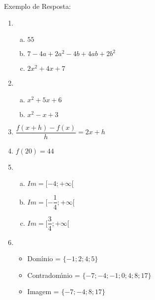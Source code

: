 \documentclass[12pt]{article}
\begin{document}

Exemplo de Resposta:
\begin{res}
    \begin{multicols}{2}

        \begin{enumerate}[(1)]

            \item
                \begin{enumerate}[(a)]
                    \item $55$
                    \item $7 - 4 a + 2 a^{2} - 4 b + 4 a b + 2 b^{2}$
                    \item $2x^{2}+4x+7$
                \end{enumerate}

            \item
                \begin{enumerate}[(a)]
                    \item $x^{2}+5x+6$
                    \item $x^{2}-x+3$
                \end{enumerate}

            \item $\dfrac{f\left( x+h\right) -f\left( x\right) }{h}=2x+h$

            \item $f\left( 20\right)=44$

            \item
                \begin{enumerate}[(a)]
                    \item $Im=[-4;+\infty[$
                    \item $Im=[-\dfrac{1}{4};+\infty[$
                    \item $Im=[\dfrac{3}{4};+\infty[$
                \end{enumerate}
            \columnbreak
            \item
                \begin{itemize}
                    \item Dom\'{\i}nio = $\{ -1;2;4;5\}$
                    \item Contradom\'{\i}nio = $\{-7;-4;-1;0;4;8;17\}$
                    \item Imagem = $\{-7;-4;8;17\}$
              \end{itemize}


\end{enumerate}
\end{multicols}
\end{res}
\end{document}
